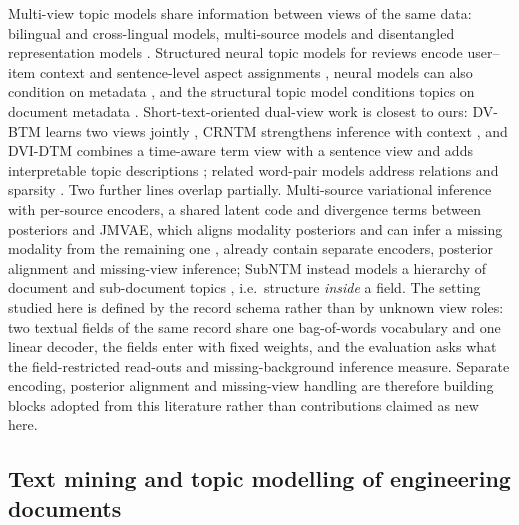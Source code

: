 \documentclass[Journal,letterpaper]{ascelike-new}
\begin{document}
Multi-view topic models share information between views of the same data: bilingual and
cross-lingual models, multi-source models and disentangled representation models
\cite{kurle2019multisource,zhang2017robust,pergola2021disentangled,liu2022dualview}. Structured
neural topic models for reviews encode user--item context and sentence-level aspect assignments
\cite{esmaeili2019structured}, neural models can also condition on metadata
\cite{card2018metadata}, and the structural topic model conditions topics on document metadata
\cite{roberts2019stm}.
Short-text-oriented dual-view work is closest to ours: DV-BTM learns two views jointly
\cite{liu2022dualview}, CRNTM strengthens inference with context \cite{crntm2020}, and DVI-DTM
combines a time-aware term view with a sentence view and adds interpretable topic descriptions
\cite{dvidtm2026}; related word-pair models address relations and sparsity
\cite{relationalbtm2018,sparsebtm2021}. Two further lines overlap partially. Multi-source
variational inference with per-source encoders, a shared latent code and divergence terms between
posteriors \cite{kurle2019multisource} and JMVAE, which aligns modality posteriors and can infer
a missing modality from the remaining one \cite{suzuki2017jmvae}, already contain separate
encoders, posterior alignment and missing-view inference; SubNTM instead models a hierarchy of
document and sub-document topics \cite{nguyen2026subntm}, i.e.\ structure \emph{inside} a field.
The setting studied here is defined by the record schema rather than by unknown view roles: two
textual fields of the same record share one bag-of-words vocabulary and one linear decoder, the
fields enter with fixed weights, and the evaluation asks what the field-restricted read-outs and
missing-background inference measure. Separate encoding, posterior alignment and missing-view
handling are therefore building blocks adopted from this literature rather than contributions
claimed as new here.

\subsection{Text mining and topic modelling of engineering documents}
\end{document}
